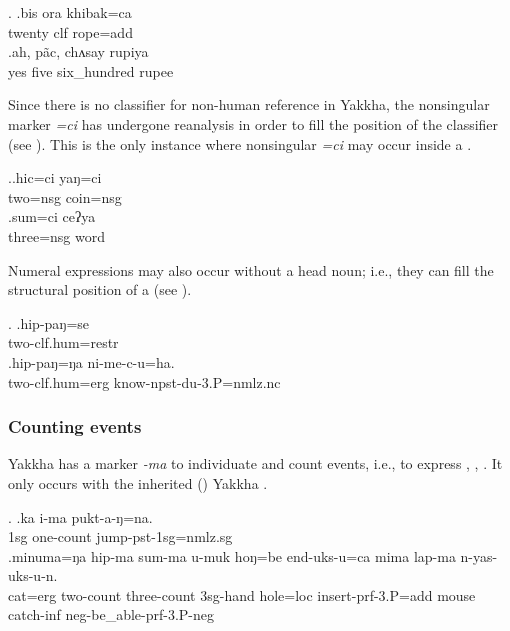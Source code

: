 \ex. \ag.bis ora  khibak=ca\\
twenty {\sc clf}  rope{\sc =add}\\
 
\bg.ah,    pãc, chʌsay     rupiya\\
yes five six\_hundred rupee\\
 

Since there is no classifier for non-human reference in Yakkha, the nonsingular marker \emph{=ci} has undergone reanalysis in order to fill the  position of the classifier (see \Next). This is the only instance where nonsingular \emph{=ci} may occur inside a . 

\ex.\ag.hic=ci yaŋ=ci\\
two{\sc =nsg} coin{\sc =nsg}\\
  
\bg.sum=ci ceʔya\\
three{\sc =nsg} word\\
  

Numeral expressions may also occur without a head noun; i.e., they can fill the structural position of a  (see \Next).

\ex. \ag.hip-paŋ=se\\
two{\sc -clf.hum=restr}\\
 
\bg.hip-paŋ=ŋa       ni-me-c-u=ha.\\
two{\sc -clf.hum=erg} know{\sc -npst-du-3.P=nmlz.nc}\\
 
			
\subsubsection{Counting events}

Yakkha has a marker \emph{-ma} to individuate and count events, i.e., to express , , . It only occurs with the inherited () Yakkha .

\ex. \ag.ka i-ma pukt-a-ŋ=na.\\
{\sc 1sg} one{\sc -count} jump{\sc -pst-1sg=nmlz.sg}\\
\bg.minuma=ŋa   hip-ma     sum-ma       u-muk       hoŋ=be    end-uks-u=ca mima  lap-ma      n-yas-uks-u-n.\\
cat{\sc =erg} two{\sc -count} three{\sc -count} {\sc 3sg-}hand hole{\sc =loc} insert{\sc -prf-3.P=add} mouse catch{\sc -inf} {\sc neg-}be\_able{\sc -prf-3.P-neg}\\
 

